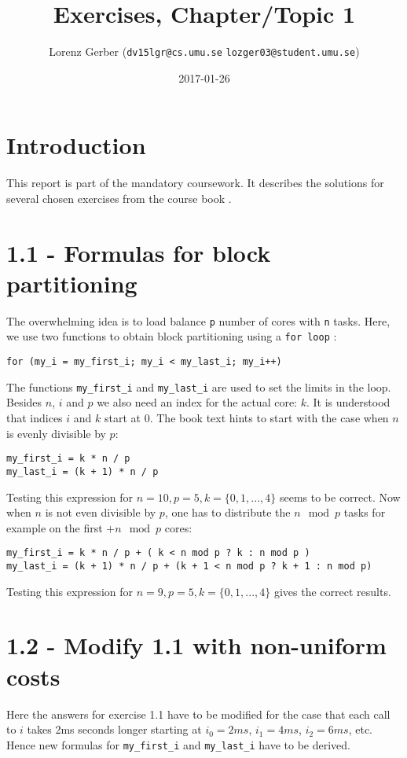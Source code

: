 \documentclass[a4paper,11pt,twoside]{article}
\title{Exercises, Chapter/Topic 1}
\author{Lorenz Gerber ({\tt{dv15lgr@cs.umu.se}} {\tt{lozger03@student.umu.se}})}
\date{2017-01-26}
\begin{document}
\lstset{language=C}
\maketitle
\thispagestyle{empty}
\newpage
\tableofcontents
\thispagestyle{empty}
\newpage

\clearpage
{}

\section{Introduction}
This report is part of the mandatory coursework. It describes the solutions for several chosen exercises from the course book \cite{pacheco2011}.
\section{1.1 - Formulas for block partitioning}
The overwhelming idea is to load balance \verb+p+ number of cores with \verb+n+ tasks. Here, we use two functions to obtain block partitioning using a \verb+for loop+ :
\begin{verbatim}
for (my_i = my_first_i; my_i < my_last_i; my_i++)
\end{verbatim}

The functions \verb+my_first_i+ and \verb+my_last_i+ are used to set the limits in the loop. Besides $n$, $i$ and $p$ we also need an index for the actual core: $k$. It is understood that indices $i$ and $k$ start at $0$. The book text hints to start with the case when $n$ is evenly divisible by $p$:
\begin{verbatim}
my_first_i = k * n / p
my_last_i = (k + 1) * n / p
\end{verbatim}
Testing this expression for $n = 10, p = 5, k = \{0, 1, ..., 4\}$ seems to be correct. Now when  $n$ is not even divisible by $p$, one has to distribute the $n \mod p$ tasks for example on the first $+n \mod p$ cores:
\begin{verbatim}
my_first_i = k * n / p + ( k < n mod p ? k : n mod p )
my_last_i = (k + 1) * n / p + (k + 1 < n mod p ? k + 1 : n mod p)  
\end{verbatim}
Testing this expression for $n = 9, p = 5, k = \{0, 1, ..., 4\}$ gives the correct results.
  
\section{1.2 - Modify 1.1 with non-uniform costs}
Here the answers for exercise 1.1 have to be modified for the case that each call to $i$ takes 2ms seconds longer starting at $i_{0} = 2ms$, $i_{1} = 4ms$, $i_{2}=6ms$, etc. Hence new formulas for \verb+my_first_i+ and \verb+my_last_i+ have to be derived.
\end{document}
